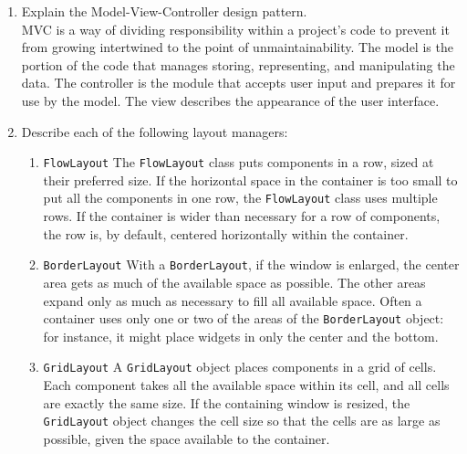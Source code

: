 \documentclass[11pt]{article}
\newenvironment{answer}{\large\lstset{basicstyle=\tiny\ttfamily}\color{white} }{}
\newenvironment{answer}{\large\lstset{basicstyle=\large\ttfamily}\color{red} }{}
\begin{document}
\begin{enumerate}
\vspace{24pt}
\item Explain the Model-View-Controller design pattern. \\
\begin{answer}
MVC is a way of dividing responsibility within a project's code to prevent it from growing intertwined to the point of unmaintainability.
The model is the portion of the code that manages storing, representing, and manipulating the data.
The controller is the module that accepts user input and prepares it for use by the model.
The view describes the appearance of the user interface.
\end{answer}


\newpage
\item Describe each of the following layout managers:
\begin{enumerate}

\item \texttt{FlowLayout}
\begin{answer}
The \texttt{FlowLayout} class puts components in a row, sized at their preferred size. If the horizontal space in the container is too small to put all the components in one row, the \texttt{FlowLayout} class uses multiple rows. If the container is wider than necessary for a row of components, the row is, by default, centered horizontally within the container. \end{answer}

\item \texttt{BorderLayout}
\begin{answer}
With a \texttt{BorderLayout}, if the window is enlarged, the center area gets as much of the available space as possible. The other areas expand only as much as necessary to fill all available space. Often a container uses only one or two of the areas of the \texttt{BorderLayout} object: for instance, it might place widgets in only the center and the bottom. \end{answer}

\item \texttt{GridLayout}
\begin{answer}
A \texttt{GridLayout} object places components in a grid of cells. Each component takes all the available space within its cell, and all cells are exactly the same size. If the containing window is resized, the \texttt{GridLayout} object changes the cell size so that the cells are as large as possible, given the space available to the container.\end{answer}
\end{enumerate}



\end{enumerate}
\end{document}
